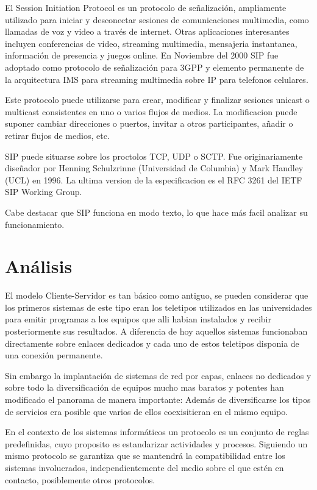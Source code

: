 \documentclass[a4paper,spanish,12pt]{book}
\begin{document}
El Session Initiation Protocol es un protocolo de señalización, ampliamente utilizado para iniciar y desconectar sesiones de comunicaciones multimedia, como llamadas de voz y video a trav\'es de internet. Otras aplicaciones interesantes incluyen conferencias de video, streaming multimedia, mensajeria instantanea, información de presencia y juegos online. En Noviembre del 2000 SIP fue adoptado como protocolo de señalización para 3GPP y elemento permanente de la arquitectura IMS para streaming multimedia sobre IP para telefonos celulares.

Este protocolo puede utilizarse para crear, modificar y finalizar sesiones unicast o multicast consistentes en uno o varios flujos de medios. La modificacion puede suponer cambiar direcciones o puertos, invitar a otros participantes, añadir o retirar flujos de medios, etc.

SIP puede situarse sobre los proctolos TCP, UDP o SCTP. Fue originariamente diseñador por Henning Schulzrinne (Universidad de Columbia) y Mark Handley (UCL) en 1996. La ultima version de la especificacion es el RFC 3261 del IETF SIP Working Group.

Cabe destacar que SIP funciona en modo texto, lo que hace más facil analizar su funcionamiento.


\chapter{Análisis}
El modelo Cliente-Servidor es tan básico como antiguo, se pueden considerar que los primeros sistemas de este tipo eran los teletipos utilizados en las universidades para emitir programas a los equipos que alli habian instalados y recibir posteriormente sus resultados. A diferencia de hoy aquellos sistemas funcionaban directamente sobre enlaces dedicados y cada uno de estos teletipos disponia de una conexión permanente.

Sin embargo la implantación de sistemas de red por capas, enlaces no dedicados y sobre todo la diversificación de equipos mucho mas baratos y potentes han modificado el panorama de manera importante: Además de diversificarse los tipos de servicios era posible que varios de ellos coexisitieran en el mismo equipo.

En el contexto de los sistemas informáticos un protocolo es un conjunto de reglas predefinidas, cuyo proposito es estandarizar actividades y procesos. Siguiendo un mismo protocolo se garantiza que se mantendrá la compatibilidad entre los sistemas involucrados, independientemente del medio sobre el que est\'en en contacto, posiblemente otros protocolos.
\end{document}
